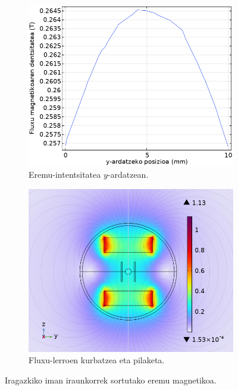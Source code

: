\documentclass[12pt]{article}
\numberwithin{figure}{section}
\numberwithin{equation}{section}
\begin{document}
\begin{figure}[h]
    \centering
    \begin{subfigure}[b]{0.45\textwidth}
        \centering
        \includegraphics[width=\linewidth]{4 - Diseinua/eremu_magnetikoa_z1.png}
        \caption{Eremu-intentsitatea $y$-ardatzean.}
        \label{fig:eremu_magz_1}
    \end{subfigure}
    \hspace{0.02\textwidth}
    \begin{subfigure}[b]{0.45\textwidth}
        \centering
        \includegraphics[width=\linewidth]{4 - Diseinua/eremu_magnetikoa_1.png}
        \caption{Fluxu-lerroen kurbatzea eta pilaketa.}
        \label{fig:fluxu_lerroak_1}
    \end{subfigure}
    \caption{Iragazkiko iman iraunkorrek sortutako eremu magnetikoa.}
    \label{fig:eremu_magnetikoa_1}
\end{figure}
\end{document}
